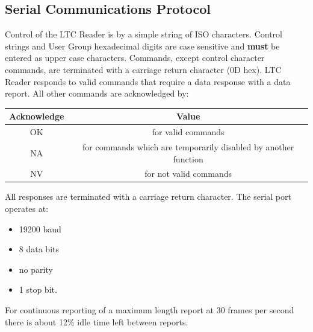 \documentclass{article}
\begin{document}
		\subsection{Serial Communications Protocol}\label{serial-communications-protocol-1}
			Control of the LTC Reader is by a simple string of ISO characters. Control strings and User Group hexadecimal digits are case sensitive and \textbf{must} be entered as upper case characters. Commands, except control character commands, are terminated with a carriage return character (0D hex).
			LTC Reader responds to valid commands that require a data response with a data report. All other commands are acknowledged by:
			\begin{center}
				\begin{tabular}{|c|c|}
					\hline
					Acknowledge & Value \\
					\hline
					OK & for valid commands \\ 
					NA & for commands which are temporarily disabled by another function \\ 
					NV & for not valid commands \\
					\hline  
				\end{tabular}
			\end{center}
			All responses are terminated with a carriage return character.
			The serial port operates at:
		\begin{itemize}
			\item
			19200 baud
			\item
			8 data bits
			\item
			no parity
			\item
			1 stop bit.
		\end{itemize}
		For continuous reporting of a maximum length report at 30 frames per second there is about 12\% idle time left between reports.
		
\end{document}
